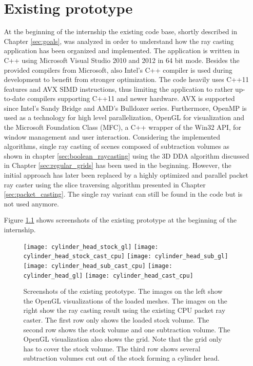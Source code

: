 \chapter{Existing prototype}
\label{sec:existing_prototype}

At the beginning of the internship the existing code base, shortly described in Chapter \ref{sec:goals}, was analyzed in order to understand how the ray casting application has been organized and implemented. The application is written in C++ using Microsoft Visual Studio 2010 and 2012 in 64 bit mode. Besides the provided compilers from Microsoft, also Intel's C++ compiler is used during development to benefit from stronger optimization. The code heavily uses C++11 features and AVX SIMD instructions, thus limiting the application to rather up-to-date compilers supporting C++11 and newer hardware. AVX is supported since Intel's Sandy Bridge and AMD's Bulldozer series. Furthermore, OpenMP is used as a technology for high level parallelization, OpenGL for visualization and the Microsoft Foundation Class (MFC), a C++ wrapper of the Win32 API, for window management and user interaction.
Considering the implemented algorithms, single ray casting of scenes composed of subtraction volumes as shown in chapter \ref{sec:boolean_raycasting} using the 3D DDA algorithm discussed in Chapter \ref{sec:regular_grids} has been used in the beginning. However, the initial approach has later been replaced by a highly optimized and parallel packet ray caster using the slice traversing algorithm presented in Chapter \ref{sec:packet_casting}. The single ray variant can still be found in the code but is not used anymore.

Figure \ref{fig:cylinder_head} shows screenshots of the existing prototype at the beginning of the internship.

\begin{figure}
\centering
\texttt{[image: cylinder\_head\_stock\_gl]}
\texttt{[image: cylinder\_head\_stock\_cast\_cpu]}
\texttt{[image: cylinder\_head\_sub\_gl]}
\texttt{[image: cylinder\_head\_sub\_cast\_cpu]}
\texttt{[image: cylinder\_head\_gl]}
\texttt{[image: cylinder\_head\_cast\_cpu]}
\caption[Screenshots of the existing prototype.]{Screenshots of the existing prototype. The images on the left show the OpenGL visualizations of the loaded meshes. The images on the right show the ray casting result using the existing CPU packet ray caster. The first row only shows the loaded stock volume. The second row shows the stock volume and one subtraction volume. The OpenGL visualization also shows the grid. Note that the grid only has to cover the stock volume. The third row shows several subtraction volumes cut out of the stock forming a cylinder head.}
\label{fig:cylinder_head}
\end{figure}

